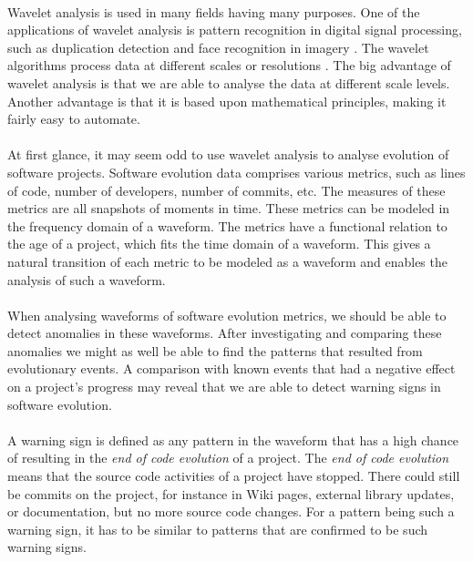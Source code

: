 \paragraph{}
Wavelet analysis is used in many fields having many purposes. One of the
applications of wavelet analysis is pattern recognition in digital signal
processing, such as duplication detection and face recognition in imagery
\cite{myna, wadkar}. The wavelet algorithms process data at different scales or
resolutions \cite{graps}. The big advantage of wavelet analysis is that we are
able to analyse the data at different scale levels. Another advantage is that it
is based upon mathematical principles, making it fairly easy to automate.

\paragraph{}
At first glance, it may seem odd to use wavelet analysis to analyse evolution of
software projects. Software evolution data comprises various metrics, such as
lines of code, number of developers, number of commits, etc. The measures of
these metrics are all snapshots of moments in time. These metrics can be
modeled in the frequency domain of a waveform. The metrics have a functional
relation to the age of a project, which fits the time domain of a waveform.
This gives a natural transition of each metric to be modeled as a waveform and
enables the analysis of such a waveform.

\paragraph{}
When analysing waveforms of software evolution metrics, we should be able to
detect anomalies in these waveforms. After investigating and comparing these
anomalies we might as well be able to find the patterns that resulted from
evolutionary events. A comparison with known events that had a negative effect
on a project's progress may reveal that we are able to detect warning signs in
software evolution.

\paragraph{}
A warning sign is defined as any pattern in the waveform that has a high chance
of resulting in the \emph{end of code evolution }\rm of a project. The
\emph{end of code evolution }\rm means that the source code activities of a
project have stopped. There could still be commits on the project, for instance
in Wiki pages, external library updates, or documentation, but no more source
code changes. For a pattern being such a warning sign, it has to be similar to
patterns that are confirmed to be such warning signs.

